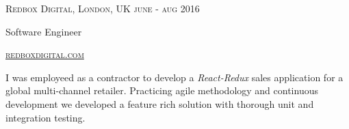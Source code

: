 {
  \textsc{\small{Redbox Digital, London, UK
    \hfill
      {\raggedleft
        june - aug 2016
      } \\
    }
  }
  {\raggedright\large {
      Software Engineer
  }}

  \textsc{\small\href{http://www.redboxdigital.com}{redboxdigital.com}}

  \normalsize{\raggedright
    I was employeed as a contractor to develop a \emph{React-Redux} sales application for a global multi-channel retailer. Practicing agile methodology and continuous development we developed a feature rich solution with thorough unit and integration testing. 
  }
}
